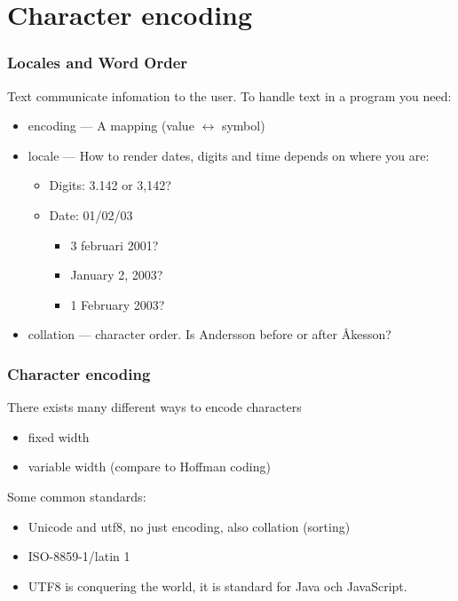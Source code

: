 \section{Character encoding}

\begin{frame}
\frametitle{Locales and Word Order}
\color{structure}
Text communicate infomation to the user. To handle text in a program you need:
\begin{itemize}
  \item encoding --- A mapping (value $ \leftrightarrow $ symbol)
  \item locale --- How to render dates, digits and time depends on where you are:
  \begin{itemize}
    \item Digits: 3.142 or 3,142?
    \item Date: 01/02/03
    \begin{itemize}\color{structure}
      \item 3 februari 2001?
      \item January 2, 2003?
      \item 1 February 2003?
    \end{itemize}
  \end{itemize}
  \item collation --- character order. Is Andersson before or after Åkesson?
\end{itemize}
\end{frame}

\begin{frame}[fragile]
\frametitle{Character encoding}
\color{structure}
There exists many different ways to encode characters
\begin{itemize}\color{structure}
  \item fixed width
  \item variable width (compare to Hoffman coding)
\end{itemize}
Some common standards:
\begin{itemize}\color{structure}
  \item Unicode and utf8, no just encoding, also collation (sorting)
  \item ISO-8859-1/latin 1
  \item UTF8 is conquering the world, it is standard for Java och JavaScript.
\end{itemize}
\end{frame}

